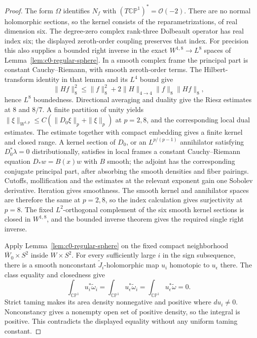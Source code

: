\documentclass[11pt]{article}
\numberwithin{equation}{section}
\theoremstyle{definition}
\theoremstyle{remark}
\newcommand{\CP}{\mathbb{CP}}
\begin{document}
\begin{proof}
The form $\Omega$ identifies $N_f$ with
$(T\CP^1)^*=\mathcal O(-2)$. There are no normal holomorphic
sections, so the kernel consists of the reparametrizations,
of real dimension six. The degree-zero complex rank-three
Dolbeault operator has real index six; the displayed
zeroth-order coupling preserves that index.
For precision this also supplies a bounded right inverse
in the exact $W^{1,8}\to L^8$ spaces of
Lemma~\ref{lem:c0-regular-sphere}.
In a smooth complex frame the principal part is constant
Cauchy--Riemann, with smooth zeroth-order terms.
The Hilbert-transform identity in that lemma and its $L^4$
bound give
\[
 \|Hf\|_8^2\le\|f\|_8^2+
           2\|H\|_{4\to4}\|f\|_8\|Hf\|_8,
\]
hence $L^8$ boundedness. Directional averaging and duality
give the Riesz estimates at $8$ and $8/7$.
A finite partition of unity yields
$\|\xi\|_{W^{1,p}}\le C(\|D_0\xi\|_p+\|\xi\|_p)$
at $p=2,8$, and the corresponding local dual estimates.
The estimate together with compact embedding gives a finite
kernel and closed range. A kernel section of $D_0$, or an
$L^{p/(p-1)}$ annihilator satisfying $D_0^*\lambda=0$
distributionally, satisfies in local frames a constant
Cauchy--Riemann equation $D_*w=B(x)w$ with $B$ smooth;
the adjoint has the corresponding conjugate principal part,
after absorbing the smooth densities and fiber pairings.
Cutoffs, mollification and the estimates at the relevant
exponent gain one Sobolev derivative. Iteration gives
smoothness. The smooth kernel and annihilator spaces are
therefore the same at $p=2,8$,
so the index calculation gives surjectivity at $p=8$.
The fixed $L^2$-orthogonal complement of the six smooth
kernel sections is closed in $W^{1,8}$, and the bounded
inverse theorem gives the required single right inverse.

Apply Lemma~\ref{lem:c0-regular-sphere} on the fixed compact
neighborhood $\overline W_0\times S^2$ inside $W\times S^2$.
For every sufficiently large $i$ in the sign subsequence,
there is a smooth nonconstant $\widetilde J_i$-holomorphic
map $u_i$ homotopic to $u_\epsilon$ there. The class equality
and closedness give
\[
 \int_{\CP^1}u_i^*\widetilde\omega_i
 =\int_{\CP^1}u_\epsilon^*\widetilde\omega_i
 =\int_{\CP^1}u_\epsilon^*\widetilde\omega=0.
\]
Strict taming makes its area density nonnegative and positive
where $du_i\ne0$. Nonconstancy gives a nonempty open set of
positive density, so the integral is positive. This contradicts
the displayed equality without any uniform taming constant.
\end{proof}
\end{document}
